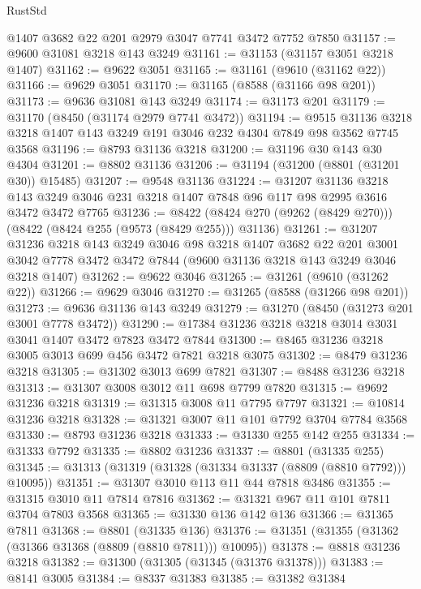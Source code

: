 \begin{lexlean}{RustStd}
\begin{coremodule}
    @1407
    @3682
    @22
    @201
    @2979
    @3047
    @7741
    @3472
    @7752
    @7850
@31157 := @9600 @31081 @3218 @143 @3249
@31161 := @31153 (@31157 @3051 @3218 @1407)
@31162 := @9622 @3051
@31165 := @31161 (@9610 (@31162 @22))
@31166 := @9629 @3051
@31170 := @31165 (@8588 (@31166 @98 @201))
@31173 := @9636 @31081 @143 @3249
@31174 := @31173 @201
@31179 := @31170 (@8450 (@31174 @2979 @7741 @3472))
@31194 := @9515
    @31136
    @3218
    @3218
    @1407
    @143
    @3249
    @191
    @3046
    @232
    @4304
    @7849
    @98
    @3562
    @7745
    @3568
@31196 := @8793 @31136 @3218
@31200 := @31196 @30 @143 @30 @4304
@31201 := @8802 @31136
@31206 := @31194 (@31200 (@8801 (@31201 @30)) @15485)
@31207 := @9548 @31136
@31224 := @31207
    @31136
    @3218
    @143
    @3249
    @3046
    @231
    @3218
    @1407
    @7848
    @96
    @117
    @98
    @2995
    @3616
    @3472
    @3472
    @7765
@31236 := @8422 (@8424 @270 (@9262 (@8429 @270))) (@8422 (@8424 @255 (@9573 (@8429 @255))) @31136)
@31261 := @31207
    @31236
    @3218
    @143
    @3249
    @3046
    @98
    @3218
    @1407
    @3682
    @22
    @201
    @3001
    @3042
    @7778
    @3472
    @3472
    @7844
    (@9600 @31136 @3218 @143 @3249 @3046 @3218 @1407)
@31262 := @9622 @3046
@31265 := @31261 (@9610 (@31262 @22))
@31266 := @9629 @3046
@31270 := @31265 (@8588 (@31266 @98 @201))
@31273 := @9636 @31136 @143 @3249
@31279 := @31270 (@8450 (@31273 @201 @3001 @7778 @3472))
@31290 := @17384 @31236 @3218 @3218 @3014 @3031 @3041 @1407 @3472 @7823 @3472 @7844
@31300 := @8465 @31236 @3218 @3005 @3013 @699 @456 @3472 @7821 @3218 @3075
@31302 := @8479 @31236 @3218
@31305 := @31302 @3013 @699 @7821
@31307 := @8488 @31236 @3218
@31313 := @31307 @3008 @3012 @11 @698 @7799 @7820
@31315 := @9692 @31236 @3218
@31319 := @31315 @3008 @11 @7795 @7797
@31321 := @10814 @31236 @3218
@31328 := @31321 @3007 @11 @101 @7792 @3704 @7784 @3568
@31330 := @8793 @31236 @3218
@31333 := @31330 @255 @142 @255
@31334 := @31333 @7792
@31335 := @8802 @31236
@31337 := @8801 (@31335 @255)
@31345 := @31313 (@31319 (@31328 (@31334 @31337 (@8809 (@8810 @7792))) @10095))
@31351 := @31307 @3010 @113 @11 @44 @7818 @3486
@31355 := @31315 @3010 @11 @7814 @7816
@31362 := @31321 @967 @11 @101 @7811 @3704 @7803 @3568
@31365 := @31330 @136 @142 @136
@31366 := @31365 @7811
@31368 := @8801 (@31335 @136)
@31376 := @31351 (@31355 (@31362 (@31366 @31368 (@8809 (@8810 @7811))) @10095))
@31378 := @8818 @31236 @3218
@31382 := @31300 (@31305 (@31345 (@31376 @31378)))
@31383 := @8141 @3005
@31384 := @8337 @31383
@31385 := @31382 @31384

\end{coremodule}
\end{lexlean}

